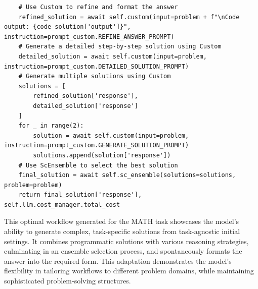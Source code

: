 \begin{tcolorbox}
\begin{verbatim}
    # Use Custom to refine and format the answer
    refined_solution = await self.custom(input=problem + f"\nCode output: {code_solution['output']}", instruction=prompt_custom.REFINE_ANSWER_PROMPT)
    # Generate a detailed step-by-step solution using Custom
    detailed_solution = await self.custom(input=problem, instruction=prompt_custom.DETAILED_SOLUTION_PROMPT)
    # Generate multiple solutions using Custom
    solutions = [
        refined_solution['response'],
        detailed_solution['response']
    ]
    for _ in range(2):
        solution = await self.custom(input=problem, instruction=prompt_custom.GENERATE_SOLUTION_PROMPT)
        solutions.append(solution['response'])
    # Use ScEnsemble to select the best solution
    final_solution = await self.sc_ensemble(solutions=solutions, problem=problem)
    return final_solution['response'], self.llm.cost_manager.total_cost
\end{verbatim}
\end{tcolorbox}
This optimal workflow generated for the MATH task showcases the model's ability to generate complex, task-specific solutions from task-agnostic initial settings. It combines programmatic solutions with various reasoning strategies, culminating in an ensemble selection process, and spontaneously formats the answer into the required form. This adaptation demonstrates the model's flexibility in tailoring workflows to different problem domains, while maintaining sophisticated problem-solving structures.

